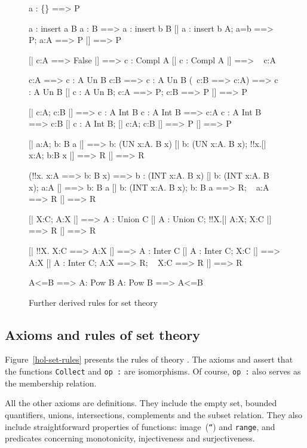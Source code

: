 \begin{figure} \underscoreon
\begin{ttbox}
   a : \{\} ==> P

 a : insert a B
 a : B ==> a : insert b B
  [| a : insert b A;  a=b ==> P;  a:A ==> P |] ==> P

   [| c:A ==> False |] ==> c : Compl A
   [| c : Compl A |] ==> ~ c:A

     c:A ==> c : A Un B
     c:B ==> c : A Un B
     (~c:B ==> c:A) ==> c : A Un B
      [| c : A Un B;  c:A ==> P;  c:B ==> P |] ==> P

     [| c:A;  c:B |] ==> c : A Int B
    c : A Int B ==> c:A
    c : A Int B ==> c:B
     [| c : A Int B;  [| c:A; c:B |] ==> P |] ==> P

     [| a:A;  b: B a |] ==> b: (UN x:A. B x)
     [| b: (UN x:A. B x);  !!x.[| x:A;  b:B x |] ==> R |] ==> R

    (!!x. x:A ==> b: B x) ==> b : (INT x:A. B x)
    [| b: (INT x:A. B x);  a:A |] ==> b: B a
    [| b: (INT x:A. B x);  b: B a ==> R;  ~ a:A ==> R |] ==> R

   [| X:C;  A:X |] ==> A : Union C
   [| A : Union C;  !!X.[| A:X;  X:C |] ==> R |] ==> R

   [| !!X. X:C ==> A:X |] ==> A : Inter C
   [| A : Inter C;  X:C |] ==> A:X
   [| A : Inter C;  A:X ==> R;  ~ X:C ==> R |] ==> R

     A<=B ==> A: Pow B
     A: Pow B ==> A<=B
\end{ttbox}
\caption{Further derived rules for set theory} \label{hol-set2}
\end{figure}


\subsection{Axioms and rules of set theory}
Figure~\ref{hol-set-rules} presents the rules of theory .  The
axioms  and  assert
that the functions {\tt Collect} and \hbox{\tt op :} are isomorphisms.  Of
course, \hbox{\tt op :} also serves as the membership relation.

All the other axioms are definitions.  They include the empty set, bounded
quantifiers, unions, intersections, complements and the subset relation.
They also include straightforward properties of functions: image~({\tt``}) and
{\tt range}, and predicates concerning monotonicity, injectiveness and
surjectiveness.  

